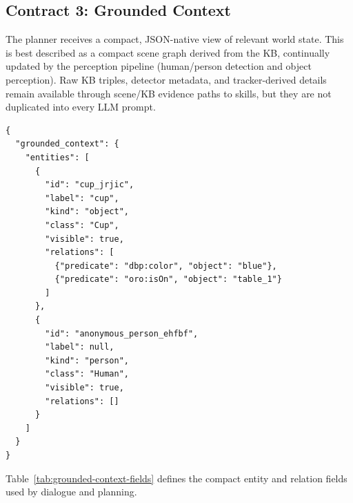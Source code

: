 \subsection{Contract 3: Grounded Context}

The planner receives a compact, JSON-native view of relevant world state. This is best described as a compact scene graph derived from the KB, continually updated by the perception pipeline (human/person detection and object perception). Raw KB triples, detector metadata, and tracker-derived details remain available through scene/KB evidence paths to skills, but they are not duplicated into every LLM prompt.

\begin{lstlisting}
{
  "grounded_context": {
    "entities": [
      {
        "id": "cup_jrjic",
        "label": "cup",
        "kind": "object",
        "class": "Cup",
        "visible": true,
        "relations": [
          {"predicate": "dbp:color", "object": "blue"},
          {"predicate": "oro:isOn", "object": "table_1"}
        ]
      },
      {
        "id": "anonymous_person_ehfbf",
        "label": null,
        "kind": "person",
        "class": "Human",
        "visible": true,
        "relations": []
      }
    ]
  }
}
\end{lstlisting}

Table~\ref{tab:grounded-context-fields} defines the compact entity and relation fields used by dialogue and planning.

